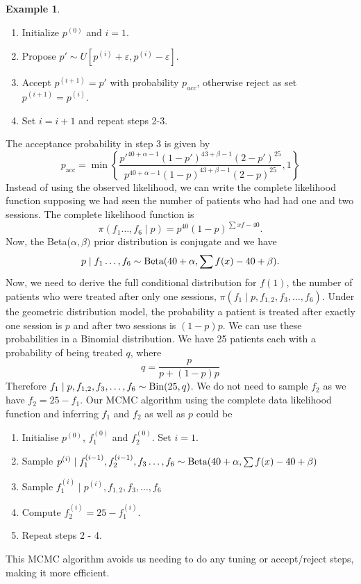 \documentclass[
]{book}
\providecommand{\tightlist}{%
  \setlength{\itemsep}{0pt}\setlength{\parskip}{0pt}}
\theoremstyle{definition}
\theoremstyle{definition}
\newtheorem{example}{Example}[chapter]
\theoremstyle{definition}
\theoremstyle{definition}
\theoremstyle{remark}
\begin{document}
\begin{example}
\begin{enumerate}
\def\labelenumi{\arabic{enumi}.}
\tightlist
\item
  Initialize \(p^{(0)}\) and \(i = 1\).
\item
  Propose \(p' \sim U[p^{(i)} + \varepsilon, p^{(i)} - \varepsilon]\).
\item
  Accept \(p^{(i+1)}=p'\) with probability \(p_{acc}\), otherwise reject as set \(p^{(i+1)}=p^{(i)}\).
\item
  Set \(i=i+1\) and repeat steps 2-3.
\end{enumerate}

The acceptance probability in step 3 is given by
\[
p_{\textrm{acc}} = \min\left\{\frac{p'^{40 + \alpha - 1}(1-p')^{43 + \beta - 1}(2-p')^{25}}{p^{40 + \alpha - 1}(1-p)^{43 + \beta - 1}(2-p)^{25}} ,1\right\}
\]
Instead of using the observed likelihood, we can write the complete likelihood function supposing we had seen the number of patients who had had one and two sessions. The complete likelihood function is
\[
\pi(f_1 \ldots, f_6 \mid p) = p^{40}(1-p)^{\sum xf - 40}. 
\]
Now, the Beta(\(\alpha, \beta)\) prior distribution is conjugate and we have
\[
p \mid f_1 \ldots, f_6  \sim \hbox{Beta}(40 + \alpha, \sum f(x) - 40 + \beta).
\]
Now, we need to derive the full conditional distribution for \(f(1)\), the number of patients who were treated after only one sessions, \(\pi(f_1 \mid p, f_{1, 2}, f_3, \ldots, f_6)\). Under the geometric distribution model, the probability a patient is treated after exactly one session is \(p\) and after two sessions is \((1-p)p\). We can use these probabilities in a Binomial distribution. We have 25 patients each with a probability of being treated \(q\), where
\[
q = \frac{p}{p + (1-p)p}
\]
Therefore \(f_1 \mid p, f_{1, 2}, f_3, \ldots, f_6 \sim \hbox{Bin}(25, q)\). We do not need to sample \(f_2\) as we have \(f_2 = 25 - f_1\). Our MCMC algorithm using the complete data likelihood function and inferring \(f_1\) and \(f_2\) as well as \(p\) could be

\begin{enumerate}
\def\labelenumi{\arabic{enumi}.}
\tightlist
\item
  Initialise \(p^{(0)}\), \(f_1^{(0)}\) and \(f_2^{(0)}\). Set \(i = 1\).
\item
  Sample \(p^{(i)} \mid f_1^{(i-1)}, f_2^{(i-1)}, f_3 \ldots, f_6 \sim \hbox{Beta}(40 + \alpha, \sum f(x) - 40 + \beta)\)
\item
  Sample \(f_1^{(i)} \mid p^{(i)}, f_{1, 2}, f_3, \ldots, f_6\)
\item
  Compute \(f_2^{(i)} = 25 - f_1^{(i)}\).
\item
  Repeat steps 2 - 4.
\end{enumerate}

This MCMC algorithm avoids us needing to do any tuning or accept/reject steps, making it more efficient.
\end{example}
\end{document}
